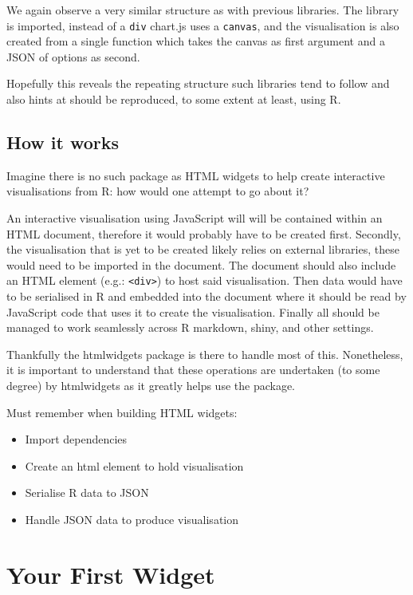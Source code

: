 \documentclass[
]{krantz}
\providecommand{\tightlist}{%
  \setlength{\itemsep}{0pt}\setlength{\parskip}{0pt}}
\begin{document}
We again observe a very similar structure as with previous libraries. The library is imported, instead of a \texttt{div} chart.js uses a \texttt{canvas}, and the visualisation is also created from a single function which takes the canvas as first argument and a JSON of options as second.

Hopefully this reveals the repeating structure such libraries tend to follow and also hints at should be reproduced, to some extent at least, using R.

\hypertarget{how-it-works}{%
\section*{How it works}\label{how-it-works}}


Imagine there is no such package as HTML widgets to help create interactive visualisations from R: how would one attempt to go about it?

An interactive visualisation using JavaScript will will be contained within an HTML document, therefore it would probably have to be created first. Secondly, the visualisation that is yet to be created likely relies on external libraries, these would need to be imported in the document. The document should also include an HTML element (e.g.: \texttt{\textless{}div\textgreater{}}) to host said visualisation. Then data would have to be serialised in R and embedded into the document where it should be read by JavaScript code that uses it to create the visualisation. Finally all should be managed to work seamlessly across R markdown, shiny, and other settings.

Thankfully the htmlwidgets package is there to handle most of this. Nonetheless, it is important to understand that these operations are undertaken (to some degree) by htmlwidgets as it greatly helps use the package.

Must remember when building HTML widgets:

\begin{itemize}
\tightlist
\item
  Import dependencies
\item
  Create an html element to hold visualisation
\item
  Serialise R data to JSON
\item
  Handle JSON data to produce visualisation
\end{itemize}

\hypertarget{your-first-widget}{%
\chapter{Your First Widget}\label{your-first-widget}}
\end{document}
